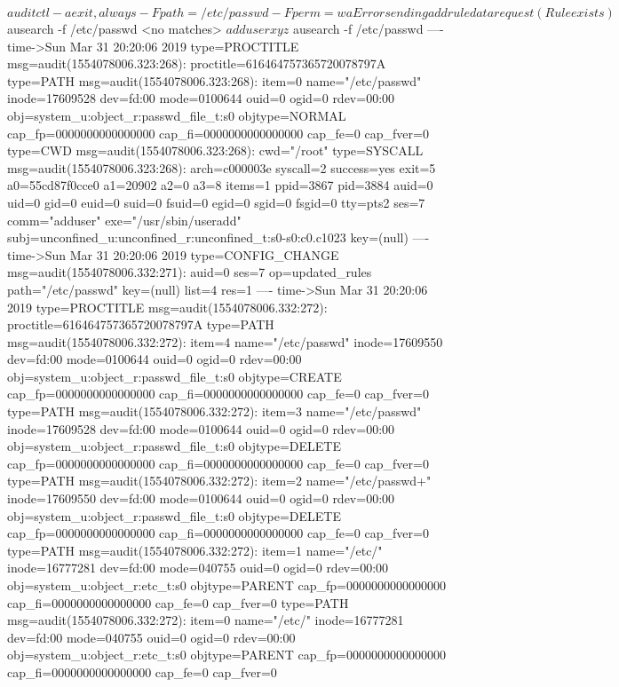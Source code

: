 \documentclass[]{report}
\newenvironment{Shaded}{}{}
\newcommand{\NormalTok}[1]{#1}
\begin{document}
\begin{Shaded}
\begin{Highlighting}[]
\NormalTok{$ auditctl -a exit,always -F path=/etc/passwd -F perm=wa}
\NormalTok{Error sending add rule data request (Rule exists)}
\NormalTok{$ ausearch -f /etc/passwd}
\NormalTok{<no matches>}
\NormalTok{$ adduser xyz}
\NormalTok{$ ausearch -f /etc/passwd}
\NormalTok{----}
\NormalTok{time->Sun Mar 31 20:20:06 2019}
\NormalTok{type=PROCTITLE msg=audit(1554078006.323:268): proctitle=616464757365720078797A}
\NormalTok{type=PATH msg=audit(1554078006.323:268): item=0 name="/etc/passwd" inode=17609528 dev=fd:00 mode=0100644 ouid=0 ogid=0 rdev=00:00 obj=system_u:object_r:passwd_file_t:s0 objtype=NORMAL cap_fp=0000000000000000 cap_fi=0000000000000000 cap_fe=0 cap_fver=0}
\NormalTok{type=CWD msg=audit(1554078006.323:268):  cwd="/root"}
\NormalTok{type=SYSCALL msg=audit(1554078006.323:268): arch=c000003e syscall=2 success=yes exit=5 a0=55cd87f0cce0 a1=20902 a2=0 a3=8 items=1 ppid=3867 pid=3884 auid=0 uid=0 gid=0 euid=0 suid=0 fsuid=0 egid=0 sgid=0 fsgid=0 tty=pts2 ses=7 comm="adduser" exe="/usr/sbin/useradd" subj=unconfined_u:unconfined_r:unconfined_t:s0-s0:c0.c1023 key=(null)}
\NormalTok{----}
\NormalTok{time->Sun Mar 31 20:20:06 2019}
\NormalTok{type=CONFIG_CHANGE msg=audit(1554078006.332:271): auid=0 ses=7 op=updated_rules path="/etc/passwd" key=(null) list=4 res=1}
\NormalTok{----}
\NormalTok{time->Sun Mar 31 20:20:06 2019}
\NormalTok{type=PROCTITLE msg=audit(1554078006.332:272): proctitle=616464757365720078797A}
\NormalTok{type=PATH msg=audit(1554078006.332:272): item=4 name="/etc/passwd" inode=17609550 dev=fd:00 mode=0100644 ouid=0 ogid=0 rdev=00:00 obj=system_u:object_r:passwd_file_t:s0 objtype=CREATE cap_fp=0000000000000000 cap_fi=0000000000000000 cap_fe=0 cap_fver=0}
\NormalTok{type=PATH msg=audit(1554078006.332:272): item=3 name="/etc/passwd" inode=17609528 dev=fd:00 mode=0100644 ouid=0 ogid=0 rdev=00:00 obj=system_u:object_r:passwd_file_t:s0 objtype=DELETE cap_fp=0000000000000000 cap_fi=0000000000000000 cap_fe=0 cap_fver=0}
\NormalTok{type=PATH msg=audit(1554078006.332:272): item=2 name="/etc/passwd+" inode=17609550 dev=fd:00 mode=0100644 ouid=0 ogid=0 rdev=00:00 obj=system_u:object_r:passwd_file_t:s0 objtype=DELETE cap_fp=0000000000000000 cap_fi=0000000000000000 cap_fe=0 cap_fver=0}
\NormalTok{type=PATH msg=audit(1554078006.332:272): item=1 name="/etc/" inode=16777281 dev=fd:00 mode=040755 ouid=0 ogid=0 rdev=00:00 obj=system_u:object_r:etc_t:s0 objtype=PARENT cap_fp=0000000000000000 cap_fi=0000000000000000 cap_fe=0 cap_fver=0}
\NormalTok{type=PATH msg=audit(1554078006.332:272): item=0 name="/etc/" inode=16777281 dev=fd:00 mode=040755 ouid=0 ogid=0 rdev=00:00 obj=system_u:object_r:etc_t:s0 objtype=PARENT cap_fp=0000000000000000 cap_fi=0000000000000000 cap_fe=0 cap_fver=0}

\end{Highlighting}
\end{Shaded}
\end{document}
